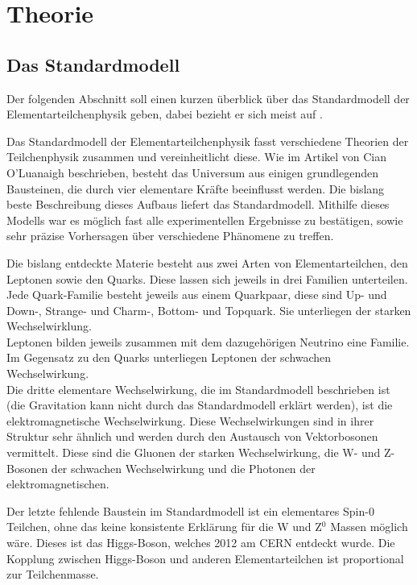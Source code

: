 \chapter{Theorie}
\label{ch:Theorie}



\section{Das Standardmodell}
\label{ch:Theorie:sec:Standardmodell}

Der folgenden Abschnitt soll einen kurzen \"uberblick \"uber das Standardmodell der Elementarteilchenphysik geben, dabei bezieht er sich meist auf \cite{SWB-39819646X}.

Das Standardmodell der Elementarteilchenphysik fasst verschiedene Theorien der Teilchenphysik zusammen und vereinheitlicht diese. Wie im Artikel von Cian O'Luanaigh \cite{O'Luanaigh:1997201} beschrieben, besteht das Universum aus einigen grundlegenden Bausteinen, die durch vier elementare Kr\"afte beeinflusst werden. Die bislang beste Beschreibung dieses Aufbaus liefert das Standardmodell. Mithilfe dieses Modells war es m\"oglich fast alle experimentellen Ergebnisse zu best\"atigen, sowie sehr pr\"azise Vorhersagen \"uber verschiedene Ph\"anomene zu treffen.

Die bislang entdeckte Materie besteht aus zwei Arten von Elementarteilchen, den Leptonen sowie den Quarks. Diese lassen sich jeweils in drei Familien unterteilen. Jede Quark-Familie besteht jeweils aus einem Quarkpaar, diese sind Up- und Down-, Strange- und Charm-, Bottom- und Topquark. Sie unterliegen der starken Wechselwirklung.\\
Leptonen bilden jeweils zusammen mit dem dazugeh\"origen Neutrino eine Familie. Im Gegensatz zu den Quarks unterliegen Leptonen der schwachen Wechselwirkung.\\
Die dritte elementare Wechselwirkung, die im Standardmodell beschrieben ist (die Gravitation kann nicht durch das Standardmodell erkl\"art werden), ist die elektromagnetische Wechselwirkung. Diese Wechselwirkungen sind in ihrer Struktur sehr \"ahnlich und werden durch den Austausch von Vektorbosonen vermittelt. Diese sind die Gluonen der starken Wechselwirkung, die W- und Z-Bosonen der schwachen Wechselwirkung und die Photonen der elektromagnetischen. 

Der letzte fehlende Baustein im Standardmodell ist ein elementares Spin-0 Teilchen, ohne das keine konsistente Erkl\"arung f\"ur die W und Z$^0$ Massen m\"oglich w\"are. Dieses ist das Higgs-Boson, welches 2012 am CERN entdeckt wurde. Die Kopplung zwischen Higgs-Boson und anderen Elementarteilchen ist proportional zur Teilchenmasse.

